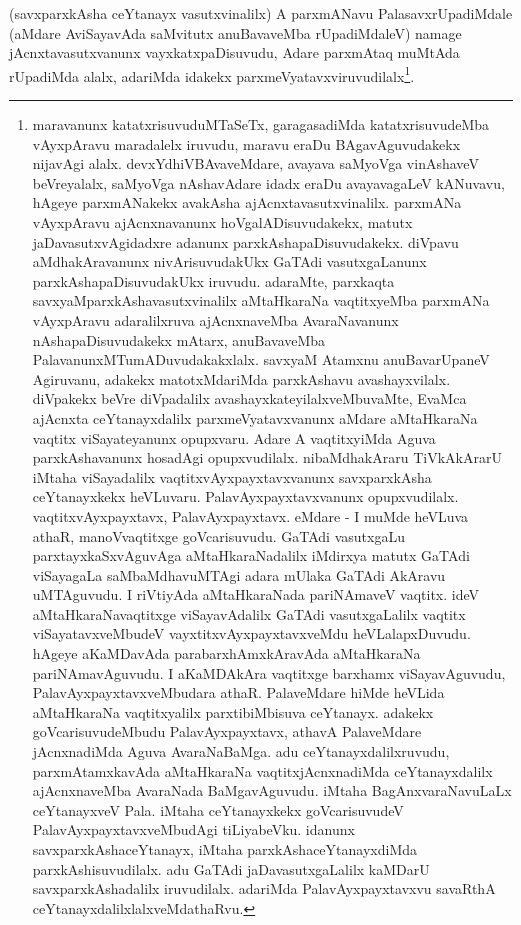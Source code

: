 \begin{artha} 
(savxparxkAsha ceYtanayx vasutxvinalilx) A parxmANavu PalasavxrUpadiMdale (aMdare AviSayavAda saMvitutx anuBavaveMba rUpadiMdaleV) namage jAcnxtavasutxvanunx vayxkatxpaDisuvudu, Adare parxmAtaq muMtAda rUpadiMda alalx, adariMda idakekx parxmeVyatavxviruvudilalx\footnote{maravanunx katatxrisuvuduMTaSeTx, garagasadiMda katatxrisuvudeMba vAyxpAravu maradalelx iruvudu, maravu eraDu BAgavAguvudakekx nijavAgi alalx. devxYdhiVBAvaveMdare, avayava saMyoVga vinAshaveV beVreyalalx, saMyoVga nAshavAdare idadx eraDu avayavagaLeV kANuvavu, hAgeye parxmANakekx avakAsha ajAcnxtavasutxvinalilx. parxmANa vAyxpAravu ajAcnxnavanunx hoVgalADisuvudakekx, matutx jaDavasutxvAgidadxre adanunx parxkAshapaDisuvudakekx. diVpavu aMdhakAravanunx nivArisuvudakUkx GaTAdi vasutxgaLanunx parxkAshapaDisuvudakUkx iruvudu. adaraMte, parxkaqta savxyaMparxkAshavasutxvinalilx aMtaHkaraNa vaqtitxyeMba parxmANa vAyxpAravu adaralilxruva ajAcnxnaveMba AvaraNavanunx nAshapaDisuvudakekx mAtarx, anuBavaveMba PalavanunxMTumADuvudakakxlalx. savxyaM Atamxnu anuBavarUpaneV Agiruvanu, adakekx matotxMdariMda parxkAshavu avashayxvilalx. diVpakekx beVre diVpadalilx avashayxkateyilalxveMbuvaMte, EvaMca ajAcnxta ceYtanayxdalilx parxmeVyatavxvanunx aMdare aMtaHkaraNa vaqtitx viSayateyanunx opupxvaru. Adare A vaqtitxyiMda Aguva parxkAshavanunx hosadAgi opupxvudilalx. nibaMdhakAraru TiVkAkArarU iMtaha viSayadalilx vaqtitxvAyxpayxtavxvanunx savxparxkAsha ceYtanayxkekx heVLuvaru. PalavAyxpayxtavxvanunx opupxvudilalx. vaqtitxvAyxpayxtavx, PalavAyxpayxtavx. eMdare - I muMde heVLuva athaR, manoVvaqtitxge goVcarisuvudu. GaTAdi vasutxgaLu parxtayxkaSxvAguvAga aMtaHkaraNadalilx iMdirxya matutx GaTAdi viSayagaLa saMbaMdhavuMTAgi adara mUlaka GaTAdi AkAravu uMTAguvudu. I riVtiyAda aMtaHkaraNada pariNAmaveV vaqtitx. ideV aMtaHkaraNavaqtitxge viSayavAdalilx GaTAdi vasutxgaLalilx vaqtitx viSayatavxveMbudeV vayxtitxvAyxpayxtavxveMdu heVLalapxDuvudu. hAgeye aKaMDavAda parabarxhAmxkAravAda aMtaHkaraNa pariNAmavAguvudu. I aKaMDAkAra vaqtitxge barxhamx viSayavAguvudu, PalavAyxpayxtavxveMbudara athaR. PalaveMdare hiMde heVLida aMtaHkaraNa vaqtitxyalilx parxtibiMbisuva ceYtanayx. adakekx goVcarisuvudeMbudu PalavAyxpayxtavx, athavA PalaveMdare jAcnxnadiMda Aguva AvaraNaBaMga. adu ceYtanayxdalilxruvudu, parxmAtamxkavAda aMtaHkaraNa vaqtitxjAcnxnadiMda ceYtanayxdalilx ajAcnxnaveMba AvaraNada BaMgavAguvudu. iMtaha BagAnxvaraNavuLaLx ceYtanayxveV Pala. iMtaha ceYtanayxkekx goVcarisuvudeV PalavAyxpayxtavxveMbudAgi tiLiyabeVku. idanunx savxparxkAshaceYtanayx, iMtaha parxkAshaceYtanayxdiMda parxkAshisuvudilalx. adu GaTAdi jaDavasutxgaLalilx kaMDarU savxparxkAshadalilx iruvudilalx. adariMda PalavAyxpayxtavxvu savaRthA ceYtanayxdalilxlalxveMdathaRvu.}.
\end{artha}

